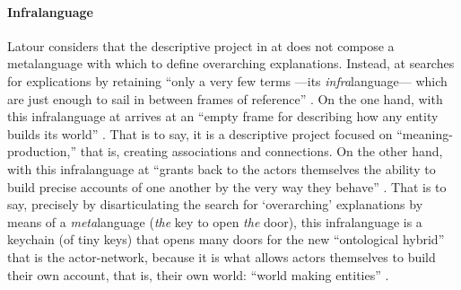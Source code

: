 \paragraph{Infralanguage}
Latour considers that the descriptive project in \gls{at} does not compose a metalanguage with which to define overarching explanations. Instead, \gls{at} searches for explications by retaining ``only a very few terms ---its \textit{infra}language--- which are just enough to sail in between frames of reference'' \im \parencite[16]{Lat90:On}. On the one hand, with this infralanguage \gls{at} arrives at an ``empty frame for describing how any entity builds its world'' \parencite[16]{Lat90:On}. That is to say, it is a descriptive project focused on ``meaning-production,'' that is, creating associations and connections. On the other hand, with this infralanguage \gls{at} ``grants back to the actors themselves the ability to build precise accounts of one another by the very way they behave'' \parencite[16]{Lat90:On}. That is to say, precisely by disarticulating the search for `overarching' explanations by means of a \textit{meta}language (\textit{the} key to open \textit{the} door), this infralanguage is a keychain (of tiny keys) that opens many doors for the new ``ontological hybrid'' that is the actor-network, because it is what allows actors themselves to build their own account, that is, their own world: ``world making entities'' \parencite[16]{Lat90:On}. 


